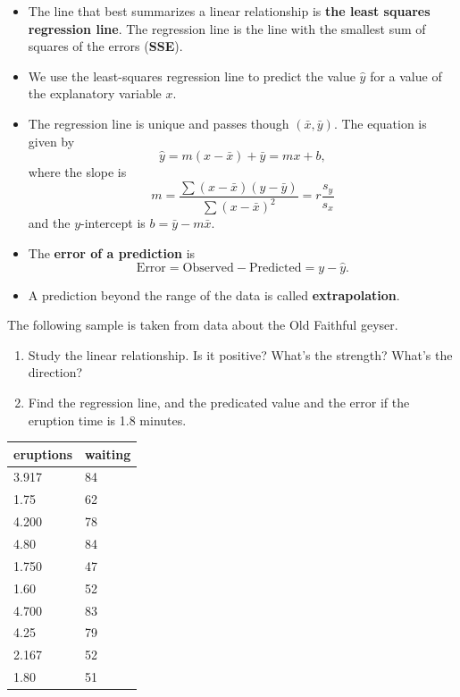 \begin{itemize}
\item
  The line that best summarizes a linear relationship is \textbf{the
  least squares regression line}. The regression line is the line with
  the smallest sum of squares of the errors (\textbf{SSE}).
\item
  We use the least-squares regression line to predict the value
  \(\hat{y}\) for a value of the explanatory variable \(x\).
\item
  The regression line is unique and passes though
  \((\bar{x}, \bar{y})\). The equation is given by
  \[\hat{y}=m(x-\bar{x})+\bar{y}=m x+b,\] where the slope is
  \[m=\frac{\sum(x-\bar{x})(y-\bar{y})}{\sum(x-\bar{x})^2}=r\frac{s_y}{s_x}\]
  and the \(y\)-intercept is \(b=\bar{y}-m\bar{x}.\)
\item
  The \textbf{error of a prediction} is
  \[\text{Error}=\text{Observed}-\text{Predicted}=y-\hat{y}.\]
\item
  A prediction beyond the range of the data is called
  \textbf{extrapolation}.
\end{itemize}

\begin{example}
  The following sample is taken from data about the Old Faithful geyser.

  \begin{enumerate}[sepno]
    \item
      Study the linear relationship. Is it positive? What's the strength? What's the direction?
    \item
      Find the regression line, and the predicated value and the error if
      the eruption time is 1.8 minutes.
    \end{enumerate}

    \begin{tabular}[c]{l|l}
      \hline
      \multicolumn{1}{c|}{\textbf{eruptions}} & 
      \multicolumn{1}{c}{\textbf{waiting}} \\
      \hline
      3.917 & 84\\
      1.75 & 62\\
      4.200 & 78\\
      4.80 & 84\\
      1.750 & 47\\
      1.60 & 52\\
      4.700 & 83\\
      4.25 & 79\\
      2.167 & 52\\
      1.80 & 51\\
      \hline
    \end{tabular}
\end{example}

